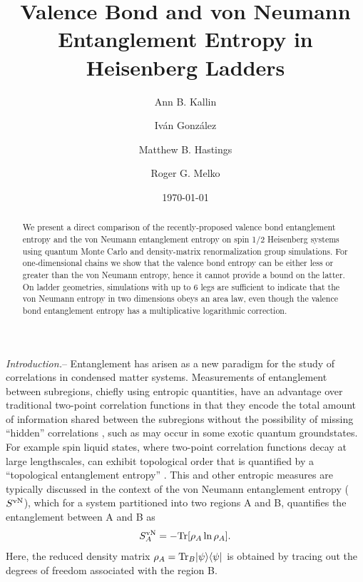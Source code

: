 \documentclass[prl,aps,twocolumn,floatfix,amsmath,amssymb,superscriptaddress,tightenlines]{revtex4}
\begin{document}
\date{\today}
\title{Valence Bond and von Neumann Entanglement Entropy in Heisenberg Ladders}
\author{Ann B. Kallin}

\author{Iv\'an Gonz\'alez}

\author{Matthew B. Hastings}

\author{Roger G. Melko}

\begin{abstract} We present a direct comparison of the recently-proposed
valence bond entanglement entropy and the von Neumann entanglement entropy on
spin 1/2 Heisenberg systems using quantum Monte Carlo and density-matrix
renormalization group simulations.  For one-dimensional chains we
show that the valence bond entropy can be either less or greater than the
von Neumann entropy, hence it cannot provide a bound on the latter.  
On ladder geometries, simulations with up to 6 legs are sufficient to indicate that
the von Neumann entropy in two dimensions obeys an area law,
even though the valence bond entanglement entropy 
has a multiplicative logarithmic correction.
\end{abstract}
\maketitle


{\it Introduction.}-- Entanglement has arisen 
as a new paradigm for the study of correlations in condensed matter systems.  
Measurements
of entanglement between subregions, chiefly using entropic
quantities, have an advantage over traditional two-point correlation
functions in that they encode the total amount of information shared
between the subregions without the possibility of missing ``hidden''
correlations \cite{wolf},
such as may occur in some exotic quantum groundstates.   For example spin liquid states, 
where two-point correlation functions decay at large lengthscales, can exhibit topological order that is quantified by a ``topological entanglement
entropy''  \cite{ KP}.
This and other entropic measures are typically discussed in the context of
the von Neumann entanglement entropy ($S^{\rm vN}$), which for a system partitioned into
two regions A and B, quantifies the entanglement between A and B as
\begin{equation} 
S^{\rm vN}_A = - {\rm Tr} [ \rho_A \ln \rho_A ]. \label{vNEE} 
\end{equation}
Here, the reduced density matrix $\rho_A = {\rm Tr}_B | \psi \rangle
\langle \psi |$ is obtained by tracing out the degrees of freedom
associated with the region B.
\end{document}
